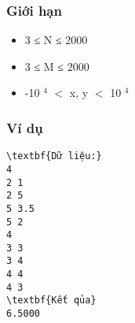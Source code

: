 \subsubsection{   Giới hạn  }
\begin{itemize}
	\item     3 ≤ N ≤ 2000   
	\item     3 ≤ M ≤ 2000   
	\item     -10    $^     4    $    $<$ x, y $<$ 10    $^     4    $
\end{itemize}

\subsubsection{   Ví dụ  }
\begin{verbatim}
\textbf{Dữ liệu:}
4
2 1 
2 5  
5 3.5  
5 2
4
3 3 
3 4 
4 4 
4 3  
\textbf{Kết qủa}
6.5000
\end{verbatim}